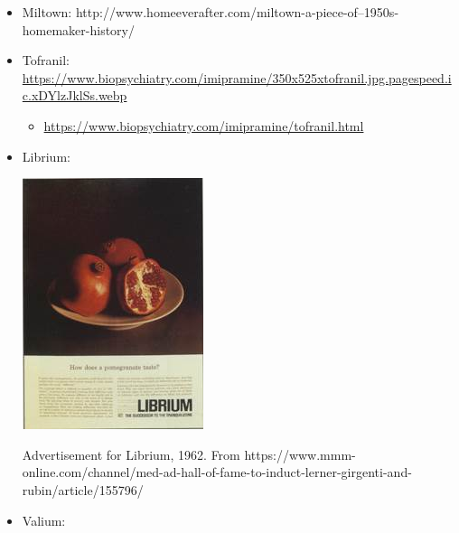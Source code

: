 \begin{refsection}
\begin{itemize}
\item Miltown: http:\slash \slash www.homeeverafter.com\slash miltown-a-piece-of--1950s-homemaker-history\slash 

\item Tofranil: \url{https://www.biopsychiatry.com/imipramine/350x525xtofranil.jpg.pagespeed.ic.xDYlzJklSs.webp}

\begin{itemize}
\item \url{https://www.biopsychiatry.com/imipramine/tofranil.html}

\end{itemize}

\item Librium: \begin{marginfigure}
 \begin{center}


 \includegraphics{../images/librium_75651.jpg}
\end{center}
 \caption{Advertisement for Librium, 1962. From https://www.mmm-online.com/channel/med-ad-hall-of-fame-to-induct-lerner-girgenti-and-rubin/article/155796/
}
\label{fig: valium65}
\end{marginfigure} 

\item Valium:
\begin{marginfigure}
 \begin{center}



\end{center}
\end{marginfigure}
\end{itemize}
\end{refsection}
